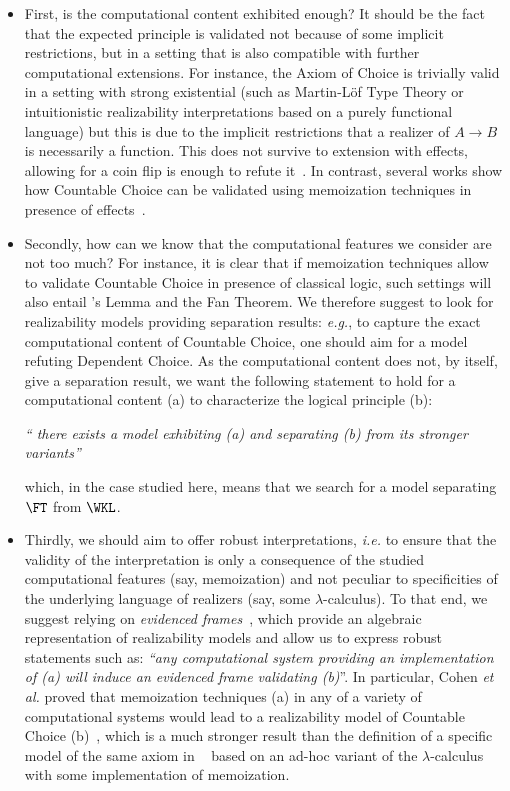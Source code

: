 \begin{itemize}
\item First, is the computational content exhibited enough? It should be the fact that the expected principle is validated not because of some implicit restrictions, but in a setting that is also compatible with further computational extensions.
For instance, the Axiom of Choice is trivially valid in a setting with strong existential (such as Martin-Löf Type Theory or intuitionistic realizability interpretations based on a purely functional language) but this is due to the implicit restrictions that a realizer of $A\to B$ is necessarily a function. This does not survive to extension with effects, allowing for a coin flip is enough to refute it~\cite{CohFarTat19}. In contrast, several works show how Countable Choice can be validated using memoization techniques in presence of effects~\cite{BerBezCoq98,Herbelin12,Miquey18a,CohFarTat19}.

\item Secondly, how can we know that the computational features we consider are not too much? For instance, it is clear that if memoization techniques allow to validate Countable Choice in presence of classical logic, such settings will also entail \Konig's Lemma and the Fan Theorem. We therefore suggest to look for realizability models providing separation results: \emph{e.g.}, to capture the exact computational content of Countable Choice, one should aim for a model refuting Dependent Choice. As the computational content does not, by itself, give a separation result, we want the following statement to hold for a computational content (a) to characterize the logical principle (b):
\begin{center}
\emph{`` there exists a model exhibiting (a) and separating (b) from its stronger variants''}
\end{center}
which, in the case studied here, means that we search for a model separating $\FT$ from $\WKL$.

\item Thirdly, we should aim to offer robust interpretations, \emph{i.e.} to ensure that the validity of the interpretation is only a consequence of the studied computational features (say, memoization) and not peculiar to specificities of the underlying language of realizers (say, some $\lambda$-calculus). To that end, we suggest relying on \emph{evidenced frames}~\cite{CohMiqTat21}, which provide an algebraic representation of realizability models and allow us to express robust statements such as:
\emph{``any computational system providing an implementation of \emph{(a)} will induce an evidenced frame validating \emph{(b)}}''. In particular, Cohen \emph{et al.} proved that memoization techniques (a) in any of a variety of computational systems would lead to a realizability model of Countable Choice (b)~\cite{CohFarTat19,CohMiqTat21}, which is a much stronger result than the definition of a specific model of the same axiom in ~\cite{Herbelin12,Miquey18a} based on an ad-hoc variant of the $\lambda$-calculus with some implementation of memoization.
\end{itemize}








